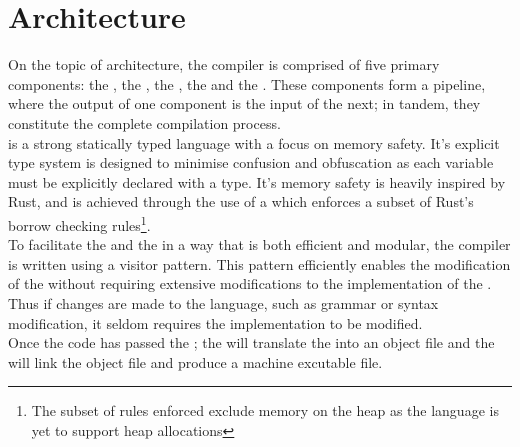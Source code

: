 \section{Architecture}
\label{sec:architecture}

On the topic of architecture, the \lang{} compiler is comprised of five primary
components: the \lexer, the \parser, the \static, the \codeGen{} and the \gcc. These
components form a pipeline, where the output of one component is the input of the
next; in tandem, they constitute the complete compilation process. \\

\lang{} is a strong statically typed language with a focus on memory safety. It's
explicit type system is designed to minimise confusion and obfuscation as each
variable must be explicitly declared with a type. It's memory safety is heavily
inspired by Rust, and is achieved through the use of a \borrowChecker{} which enforces
a subset of Rust's borrow checking rules\footnote{The subset of rules enforced
exclude memory on the heap as the language is yet to support heap allocations}. \\



To facilitate the \static{} and the \codeGen{} in a way that is both efficient and
modular, the \lang{} compiler is written using a visitor pattern. This pattern
efficiently enables the modification of the \ast{} without requiring extensive
modifications to the implementation of the \ast. Thus if changes are made to the
\lang{} language, such as grammar or syntax modification, it seldom requires the
\ast{} implementation to be modified. \\

Once the code has passed the \static{}; the \codeGen{} will translate the \ast{} into
an object file and the \gcc{} will link the object file and produce a machine excutable file.

\newpage






\newpage
